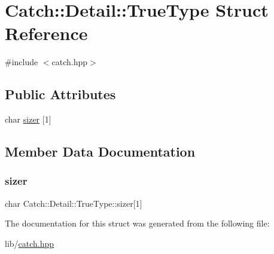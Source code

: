 \hypertarget{struct_catch_1_1_detail_1_1_true_type}{}\section{Catch\+:\+:Detail\+:\+:True\+Type Struct Reference}
\label{struct_catch_1_1_detail_1_1_true_type}


{\ttfamily \#include $<$catch.\+hpp$>$}

\subsection*{Public Attributes}
\begin{DoxyCompactItemize}
\item 
char \hyperlink{struct_catch_1_1_detail_1_1_true_type_a3aaaeb75909e668b293c8a81f5fb6419}{sizer} \mbox{[}1\mbox{]}
\end{DoxyCompactItemize}


\subsection{Member Data Documentation}
\hypertarget{struct_catch_1_1_detail_1_1_true_type_a3aaaeb75909e668b293c8a81f5fb6419}{}\label{struct_catch_1_1_detail_1_1_true_type_a3aaaeb75909e668b293c8a81f5fb6419} 
\subsubsection{\texorpdfstring{sizer}{sizer}}
{\footnotesize\ttfamily char Catch\+::\+Detail\+::\+True\+Type\+::sizer\mbox{[}1\mbox{]}}



The documentation for this struct was generated from the following file\+:\begin{DoxyCompactItemize}
\item 
lib/\hyperlink{catch_8hpp}{catch.\+hpp}\end{DoxyCompactItemize}
